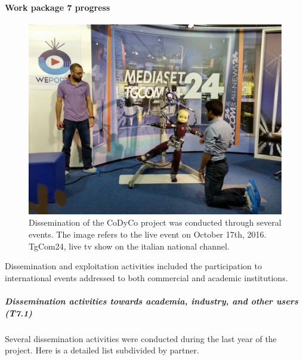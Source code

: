 

\paragraph{Work package 7 progress}

\begin{figure}
  \centering
    \includegraphics[width=1\columnwidth]{images/tg24}
  \caption{Dissemination of the CoDyCo project was conducted through several events. The image refers to the
  live event on October 17th, 2016. TgCom24, live tv show on the italian national channel.}
 \label{fig:schemeAlgorithm4}
\end{figure}


Dissemination and exploitation activities included the participation to international events addressed to both commercial and academic institutions. 

\subparagraph{Dissemination activities towards academia, industry, and other users (T7.1)}

Several dissemination activities were conducted during the last year of the project. Here is a
detailed list subdivided by partner.

